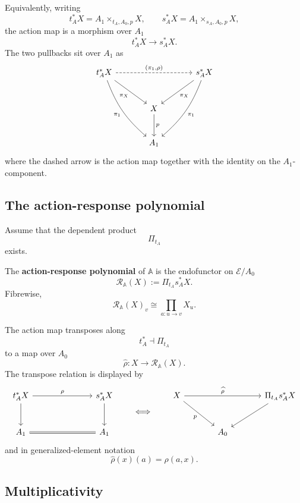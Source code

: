 Equivalently, writing
\[
t_A^\ast X=A_1\times_{t_A,A_0,p}X,
\qquad
s_A^\ast X=A_1\times_{s_A,A_0,p}X,
\]
the action map is a morphism over \(A_1\)
\[
t_A^\ast X\to s_A^\ast X.
\]
The two pullbacks sit over \(A_1\) as
\[
\begin{tikzcd}[column sep=large,row sep=large]
t_A^\ast X
  \arrow[rr,dashed,"{(\pi_1,\rho)}"]
  \arrow[dr,"\pi_X"']
  \arrow[ddr,bend right=14,"\pi_1"']
&&
s_A^\ast X
  \arrow[dl,"\pi_X"]
  \arrow[ddl,bend left=14,"\pi_1"]
\\
&
X
  \arrow[d,"p"]
&
\\
&
A_1
&
\end{tikzcd}
\]
where the dashed arrow is the action map together with the identity on the
\(A_1\)-component.

\subsection{The action-response polynomial}
\label{subsec:poly-relative-action-response-polynomial}

Assume that the dependent product
\[
\Pi_{t_A}
\]
exists.

\begin{definition}
\label{def:poly-relative-action-response-polynomial}
The \textbf{action-response polynomial} of \(\mathbb A\) is the endofunctor on
\(\mathcal E/A_0\)
\[
\mathcal R_{\mathbb A}(X)
:=
\Pi_{t_A}s_A^\ast X.
\]
Fibrewise,
\[
\mathcal R_{\mathbb A}(X)_v
\cong
\prod_{a:u\to v}X_u.
\]
\end{definition}

The action map transposes along
\[
t_A^\ast\dashv\Pi_{t_A}
\]
to a map over \(A_0\)
\[
\widehat\rho:
X\to\mathcal R_{\mathbb A}(X).
\]
The transpose relation is displayed by
\[
\begin{tikzcd}[column sep=large,row sep=large]
t_A^\ast X
  \arrow[rr,"\rho"]
  \arrow[d]
&&
s_A^\ast X
  \arrow[d]
\\
A_1
  \arrow[rr,equal]
&&
A_1
\end{tikzcd}
\qquad\Longleftrightarrow\qquad
\begin{tikzcd}[column sep=large,row sep=large]
X
  \arrow[rr,"\widehat\rho"]
  \arrow[dr,"p"']
&&
\Pi_{t_A}s_A^\ast X
  \arrow[dl]
\\
&
A_0
&
\end{tikzcd}
\]
and in generalized-element notation
\[
\widehat\rho(x)(a)=\rho(a,x).
\]

\subsection{Multiplicativity}
\label{subsec:poly-relative-action-response-multiplicativity}

